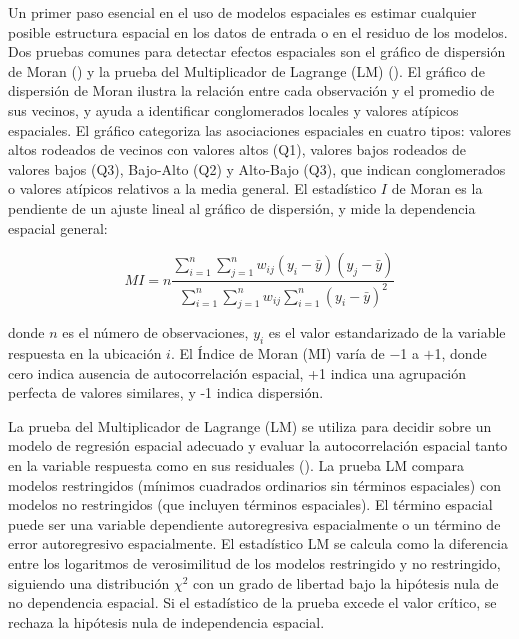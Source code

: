\documentclass[
  manuscript=article,  
  layout=preprint,  
  year=2023,
  volume=0,
]{format}
\begin{document}
Un primer paso esencial en el uso de modelos espaciales es estimar cualquier posible estructura espacial en los datos de entrada o en el residuo de los modelos. Dos pruebas comunes para detectar efectos espaciales son el gráfico de dispersión de Moran (\cite{anselin1988spatial}) y la prueba del Multiplicador de Lagrange (LM) (\cite{anselin1996simple}). El gráfico de dispersión de Moran ilustra la relación entre cada observación y el promedio de sus vecinos, y ayuda a identificar conglomerados locales y valores atípicos espaciales. El gráfico categoriza las asociaciones espaciales en cuatro tipos: valores altos rodeados de vecinos con valores altos (Q1), valores bajos rodeados de valores bajos (Q3), Bajo-Alto (Q2) y Alto-Bajo (Q3), que indican conglomerados o valores atípicos relativos a la media general. El estadístico $I$ de Moran es la pendiente de un ajuste lineal al gráfico de dispersión, y mide la dependencia espacial general:

\begin{equation} \label{eq:1} MI = n \frac{\sum_{i=1}^n \sum_{j=1}^n w_{ij} (y_i-\bar{y}) (y_j-\bar{y})} {\sum_{i=1}^n \sum_{j=1}^n w_{ij} \sum_{i=1}^n (y_i-\bar{y})^2} \end{equation}

donde $n$ es el número de observaciones, $y_i$ es el valor estandarizado de la variable respuesta en la ubicación $i$. El Índice de Moran (MI)  varía de $-$1 a $+$1, donde cero indica ausencia de autocorrelación espacial, +1 indica una agrupación perfecta de valores similares, y -1 indica dispersión.

\par La prueba del Multiplicador de Lagrange (LM) se utiliza para decidir sobre un modelo de regresión espacial adecuado y evaluar la autocorrelación espacial tanto en la variable respuesta como en sus residuales (\cite{anselin1988spatial}). La prueba LM compara modelos restringidos (mínimos cuadrados ordinarios sin términos espaciales) con modelos no restringidos (que incluyen términos espaciales). El término espacial puede ser una variable dependiente autoregresiva espacialmente o un término de error autoregresivo espacialmente. El estadístico LM se calcula como la diferencia entre los logaritmos de verosimilitud de los modelos restringido y no restringido, siguiendo una distribución $\chi^2$ con un grado de libertad bajo la hipótesis nula de no dependencia espacial. Si el estadístico de la prueba excede el valor crítico, se rechaza la hipótesis nula de independencia espacial.
\end{document}
